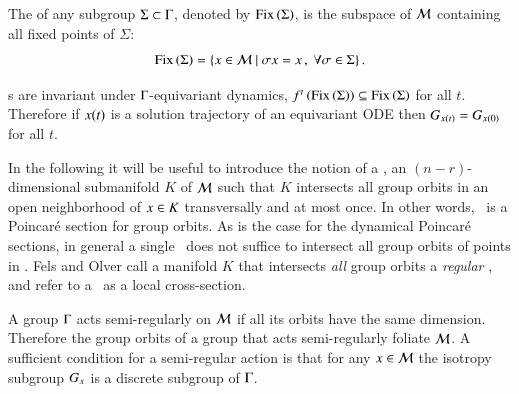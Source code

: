 The \emph{\fixedsp} of any subgroup $\Sigma\subset\Gamma$,
denoted by $\mathrm{Fix}\left(\Sigma\right)$, is the subspace of $\mathcal{M}$ containing all fixed points of $\Sigma$:
\[
	\mathrm{Fix}\left(\Sigma\right)=\{x\in\mathcal{M}\ |\ \sigma x = x\,,\ \forall \sigma\in\Sigma\}\,.
\]

\Fixedsp s are invariant under $\Gamma$-equivariant dynamics,
$f^t\left(\mathrm{Fix}\left(\Sigma\right)\right)\subseteq \mathrm{Fix}\left(\Sigma\right)$ for all
$t$. Therefore if $x(t)$ is a solution trajectory of an
equivariant ODE then $G_{x(t)}=G_{x(0)}$ for all $t$.

In the following it will be useful to introduce the
notion of a \emph{\slice}, an $(n-r)$-dimensional submanifold $K$
of $\mathcal{M}$ such that $K$ intersects all group orbits in an
open neighborhood of $x \in K$
transversally and at most once.
In other words, \slice\ is a Poincar\'e section for group
orbits. As is the case for the dynamical Poincar\'e sections,
in general a single \slice\ does not suffice to intersect all
group orbits of points in \pS. Fels and Olver
call a manifold $K$ that intersects \emph{all} group orbits a
\emph{regular \csection}, and refer to a \slice\ as a local
cross-section.

A group $\Gamma$ acts semi-regularly on ${\cal M}$ if all its orbits have
the same dimension. Therefore the group orbits of a group that
acts semi-regularly foliate ${\cal M}$. A sufficient condition for a semi-regular
action is that for any $x\in{\cal M}$ the isotropy subgroup $G_{x}$ is
a discrete subgroup of $\Gamma$.

